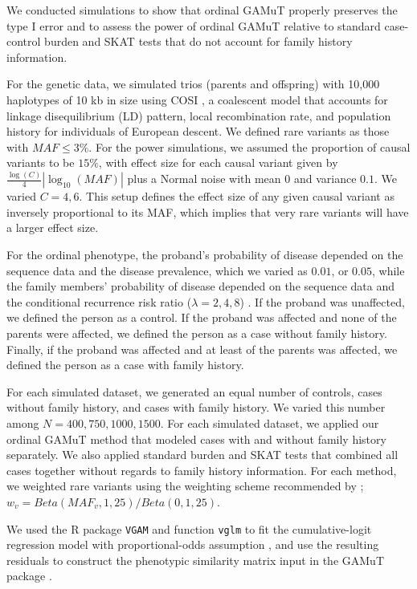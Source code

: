 \documentclass[]{article}
\theoremstyle{definition}
\theoremstyle{definition}
\theoremstyle{definition}
\theoremstyle{remark}
\begin{document}
We conducted simulations to show that ordinal GAMuT properly preserves
the type I error and to assess the power of ordinal GAMuT relative to
standard case-control burden \citep{Li2008, Madsen2009} and SKAT
\citep{Wu2011} tests that do not account for family history information.

For the genetic data, we simulated trios (parents and offspring) with
10,000 haplotypes of 10 kb in size using COSI \citep{cosi}, a coalescent
model that accounts for linkage disequilibrium (LD) pattern, local
recombination rate, and population history for individuals of European
descent. We defined rare variants as those with \(MAF \leq 3\%\). For
the power simulations, we assumed the proportion of causal variants to
be \(15\%\), with effect size for each causal variant given by
\(\frac{\log(C)}{4}|\log_{10}(MAF)|\) plus a Normal noise with mean
\(0\) and variance \(0.1\). We varied \(C=4,6\). This setup defines the
effect size of any given causal variant as inversely proportional to its
MAF, which implies that very rare variants will have a larger effect
size.

For the ordinal phenotype, the proband's probability of disease depended
on the sequence data and the disease prevalence, which we varied as
\(0.01\), or \(0.05\), while the family members' probability of disease
depended on the sequence data and the conditional recurrence risk ratio
(\(\lambda=2,4,8\)) \citep{Epstein2015}. If the proband was unaffected,
we defined the person as a control. If the proband was affected and none
of the parents were affected, we defined the person as a case without
family history. Finally, if the proband was affected and at least of the
parents was affected, we defined the person as a case with family
history.

For each simulated dataset, we generated an equal number of controls,
cases without family history, and cases with family history. We varied
this number among \(N=400, 750, 1000, 1500\). For each simulated
dataset, we applied our ordinal GAMuT method that modeled cases with and
without family history separately. We also applied standard burden and
SKAT tests that combined all cases together without regards to family
history information. For each method, we weighted rare variants using
the weighting scheme recommended by \citet{Wu2011};
\(w_v=Beta(MAF_v,1,25)/Beta(0,1,25)\).

We used the R package \texttt{VGAM} and function \texttt{vglm} to fit
the cumulative-logit regression model with proportional-odds assumption
\citep{Yee2010}, and use the resulting residuals to construct the
phenotypic similarity matrix input in the GAMuT package
\citep{Broadaway2016}.
\end{document}
